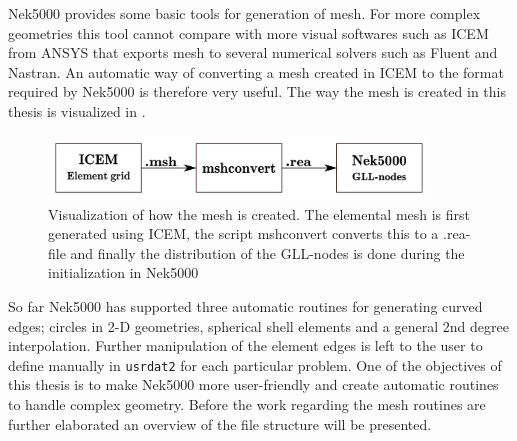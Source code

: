 
Nek5000 provides some basic tools for generation of mesh. For more complex geometries this tool cannot compare with more visual softwares 
such as ICEM from ANSYS that exports mesh to several numerical solvers such as Fluent and Nastran.
An automatic way of converting a mesh created in ICEM to the format required by Nek5000 is therefore very useful. 
The way the mesh is created in this thesis is visualized in .
%
\begin{figure}[h]
	\centering
	\includegraphics[width=0.9\textwidth]{Figures/mesh2.pdf}
	\caption{Visualization of how the mesh is created. The elemental mesh is first generated using ICEM, the script mshconvert
    converts this to a .rea-file and finally the distribution of the GLL-nodes is done during the initialization in Nek5000}
	\label{fig:mesh}
\end{figure}
%

So far Nek5000 has supported three automatic routines for generating curved edges;
circles in 2-D geometries, spherical shell elements and a general 2nd degree interpolation.
Further manipulation of the element edges is left to the user to define manually in \verb|usrdat2|
for each particular problem. One of the objectives of this thesis is to make Nek5000 more
user-friendly and create automatic routines to handle complex geometry. Before the work regarding
the mesh routines are further elaborated an overview of the file structure will be presented.

